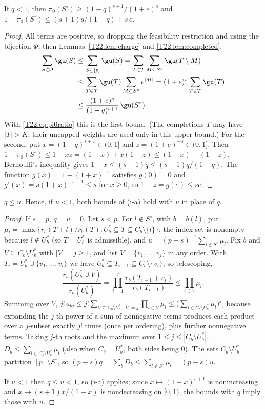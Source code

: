 \documentclass[11pt]{report}
\begin{document}
\begin{T22proposition}[(i-a)]
If $q<1$, then $\pi_0(S^\circ)\ge(1-q)^{s+1}/(1+e)^s$ and $1-\pi_0(S^\circ)\le (s+1)q/(1-q)+s\,e$.
\end{T22proposition}

\begin{proof}
All terms are positive, so dropping the feasibility restriction and using the bijection $\Phi$, then Lemmas~\ref{T22:lem:charge} and \ref{T22:lem:completed},
\[
\begin{aligned}
\sum_{S\in\Omega}\gu(S)&\le\sum_{S\subseteq[p]}\gu(S)=\sum_{T\in\mathcal T}\sum_{M\subseteq S^\circ}\gu(T\setminus M)\\
&\le\sum_{T\in\mathcal T}\gu(T)\sum_{M\subseteq S^\circ}e^{|M|}=(1+e)^s\sum_{T\in\mathcal T}\gu(T)\\
&\le\frac{(1+e)^s}{(1-q)^{s+1}}\,\gu(S^\circ).
\end{aligned}
\]
With \eqref{T22:eq:pi0ratio} this is the first bound. (The completions $T$ may have $|T|>K$; their uncapped weights are used only in this upper bound.) For the second, put $x=(1-q)^{s+1}\in(0,1]$ and $z=(1+e)^{-s}\in(0,1]$. Then $1-\pi_0(S^\circ)\le 1-xz=(1-x)+x(1-z)\le(1-x)+(1-z)$. Bernoulli's inequality gives $1-x\le(s+1)q\le (s+1)q/(1-q)$. The function $g(x)=1-(1+x)^{-s}$ satisfies $g(0)=0$ and $g'(x)=s(1+x)^{-s-1}\le s$ for $x\ge0$, so $1-z=g(e)\le se$.
\end{proof}

\begin{T22proposition}[(i-b)]
$q\le u$. Hence, if $u<1$, both bounds of (i-a) hold with $u$ in place of $q$.
\end{T22proposition}

\begin{proof}
If $s=p$, $q=u=0$. Let $s<p$. For $l\notin S^\circ$, with $b=b(l)$, put $\mu_l=\max\{r_b(T+l)/r_b(T):U_b^*\subseteq T\subseteq C_b\setminus\{l\}\}$; the index set is nonempty because $l\notin U_b^*$ (so $T=U_b^*$ is admissible), and $u=(p-s)^{-1}\sum_{l\notin S^\circ}\mu_l$. Fix $b$ and $V\subseteq C_b\setminus U_b^*$ with $|V|=j\ge1$, and list $V=\{v_1,\dots,v_j\}$ in any order. With $T_i=U_b^*\cup\{v_1,\dots,v_i\}$ we have $U_b^*\subseteq T_{i-1}\subseteq C_b\setminus\{v_i\}$, so telescoping,
\[
\frac{r_b(U_b^*\cup V)}{r_b(U_b^*)}=\prod_{i=1}^{j}\frac{r_b(T_{i-1}+v_i)}{r_b(T_{i-1})}\le\prod_{l\in V}\mu_l .
\]
Summing over $V$, $j!\,a_{bj}\le j!\sum_{V\subseteq C_b\setminus U_b^*,\,|V|=j}\prod_{l\in V}\mu_l\le\bigl(\sum_{l\in C_b\setminus U_b^*}\mu_l\bigr)^j$, because expanding the $j$-th power of a sum of nonnegative terms produces each product over a $j$-subset exactly $j!$ times (once per ordering), plus further nonnegative terms. Taking $j$-th roots and the maximum over $1\le j\le|C_b\setminus U_b^*|$, $D_b\le\sum_{l\in C_b\setminus U_b^*}\mu_l$ (also when $C_b=U_b^*$, both sides being $0$). The sets $C_b\setminus U_b^*$ partition $[p]\setminus S^\circ$, so $(p-s)q=\sum_bD_b\le\sum_{l\notin S^\circ}\mu_l=(p-s)u$.

If $u<1$ then $q\le u<1$, so (i-a) applies; since $x\mapsto(1-x)^{s+1}$ is nonincreasing and $x\mapsto(s+1)x/(1-x)$ is nondecreasing on $[0,1)$, the bounds with $q$ imply those with $u$.
\end{proof}
\end{document}
